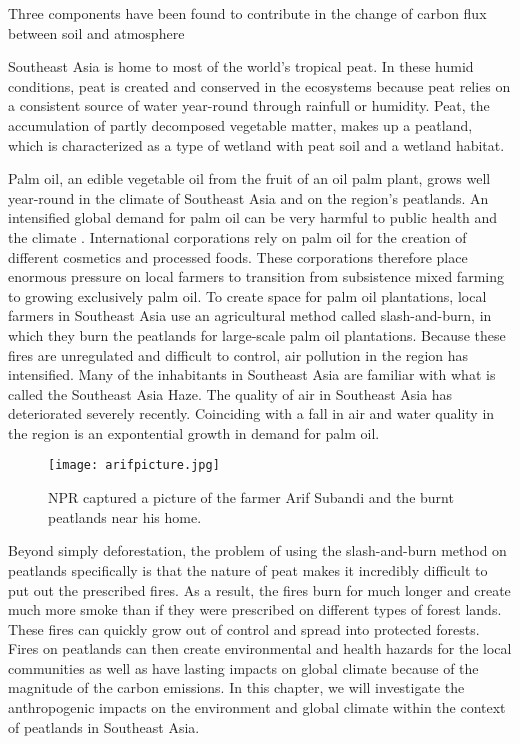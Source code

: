 Three components have been found to contribute in the change of carbon flux between soil and atmosphere




Southeast Asia is home to most of the world's tropical peat. In these humid conditions, peat is created and conserved in the ecosystems because peat relies on a consistent source of water year-round through rainfull or humidity. Peat, the accumulation of partly decomposed vegetable matter, makes up a peatland, which is characterized as a type of wetland with peat soil and a wetland habitat. 

Palm oil, an edible vegetable oil from the fruit of an oil palm plant, grows well year-round in the climate of Southeast Asia and on the region's peatlands. An intensified global demand for palm oil can be very harmful to public health and the climate \citep{knitr2013}. International corporations rely on palm oil for the creation of different cosmetics and processed foods. These corporations therefore place enormous pressure on local farmers to transition from subsistence mixed farming to growing exclusively palm oil. To create space for palm oil plantations, local farmers in Southeast Asia use an agricultural method called slash-and-burn, in which they burn the peatlands for large-scale palm oil plantations. Because these fires are unregulated and difficult to control, air pollution in the region has intensified. Many of the inhabitants in Southeast Asia are familiar with what is called the Southeast Asia Haze. The quality of air in Southeast Asia has deteriorated severely recently. Coinciding with a fall in air and water quality in the region is an expontential growth in demand for palm oil. 

\begin{figure}[!ht]
  \texttt{[image: arifpicture.jpg]}
  \caption{NPR captured a picture of the farmer Arif Subandi and the burnt peatlands near his home.}
  \label{fig:arifpicture}
\end{figure}

Beyond simply deforestation, the problem of using the slash-and-burn method on peatlands specifically is that the nature of peat makes it incredibly difficult to put out the prescribed fires. As a result, the fires burn for much longer and create much more smoke than if they were prescribed on different types of forest lands. These fires can quickly grow out of control and spread into protected forests. Fires on peatlands can then create environmental and health hazards for the local communities as well as have lasting impacts on global climate because of the magnitude of the carbon emissions. In this chapter, we will investigate the anthropogenic impacts on the environment and global climate within the context of peatlands in Southeast Asia. 

